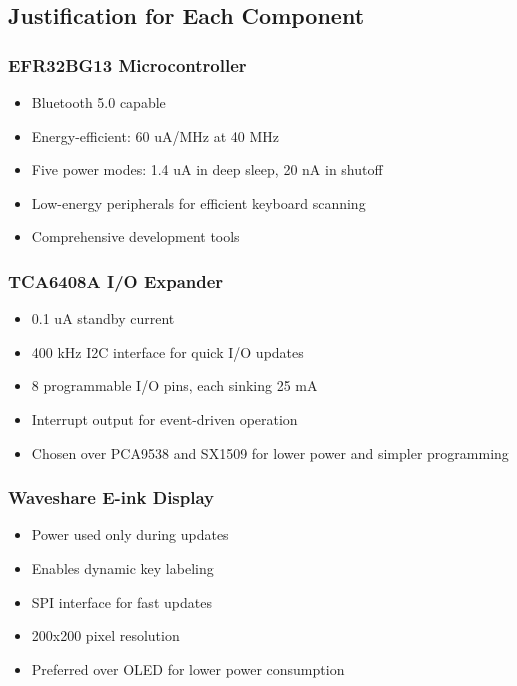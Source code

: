 \documentclass[a4paper,11pt]{article}%
\begin{document}
\subsection{Justification for Each Component}

\subsubsection{EFR32BG13 Microcontroller}
\begin{itemize}
    \item Bluetooth 5.0 capable
    \item Energy-efficient: 60 uA/MHz at 40 MHz
    \item Five power modes: 1.4 uA in deep sleep, 20 nA in shutoff
    \item Low-energy peripherals for efficient keyboard scanning
    \item Comprehensive development tools
\end{itemize}


\subsubsection{TCA6408A I/O Expander}
\begin{itemize}
    \item 0.1 uA standby current
    \item 400 kHz I2C interface for quick I/O updates
    \item 8 programmable I/O pins, each sinking 25 mA
    \item Interrupt output for event-driven operation
    \item Chosen over PCA9538 and SX1509 for lower power and simpler programming
\end{itemize}


\subsubsection{Waveshare E-ink Display}
\begin{itemize}
    \item Power used only during updates
    \item Enables dynamic key labeling
    \item SPI interface for fast updates
    \item 200x200 pixel resolution
    \item Preferred over OLED for lower power consumption
\end{itemize}
\end{document}
